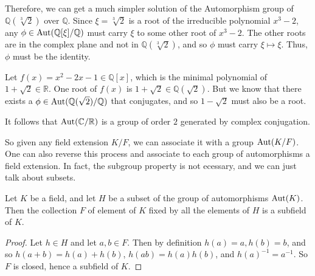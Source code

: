  \begin{example}
    Therefore, we can get a much simpler solution of the Automorphism group of $\mathbb{Q}(\sqrt[3]{2})$ over $\mathbb{Q}$. Since $\xi = \sqrt[3]{2}$ is a root of the irreducible polynomial $x^3 - 2$, any $\phi \in \Aut(\mathbb{Q}[\xi]/\mathbb{Q})$ must carry $\xi$ to some other root of $x^3 - 2$. The other roots are in the complex plane and not in $\mathbb{Q}(\sqrt[3]{2})$, and so $\phi$ must carry $\xi \mapsto \xi$. Thus, $\phi$ must be the identity. 
  \end{example}

  \begin{example}
    Let $f(x) = x^2 - 2x - 1 \in \mathbb{Q}[x]$, which is the minimal polynomial of $1 + \sqrt{2} \in \mathbb{R}$. One root of $f(x)$ is $1 + \sqrt{2} \in \mathbb{Q}(\sqrt{2})$. But we know that there exists a $\phi \in \Aut(\mathbb{Q}(\sqrt{2})/\mathbb{Q})$ that conjugates, and so $1 - \sqrt{2}$ must also be a root. 
  \end{example} 

  \begin{example}
    It follows that $\Aut(\mathbb{C}/\mathbb{R})$ is a group of order $2$ generated by complex conjugation. 
  \end{example} 

  So given any field extension $K/F$, we can associate it with a group $\Aut(K/F)$. One can also reverse this process and associate to each group of automorphisms a field extension. In fact, the subgroup property is not ecessary, and we can just talk about subsets. 

  \begin{theorem}[]
    Let $K$ be a field, and let $H$ be a subset of the group of automorphisms $\Aut(K)$. Then the collection $F$ of element of $K$ fixed by all the elements of $H$ is a subfield of $K$. 
  \end{theorem}
  \begin{proof}
    Let $h \in H$ and let $a, b \in F$. Then by definition $h(a) = a, h(b) = b$, and so $h(a + b) = h(a) + h(b)$, $h(ab) = h(a) h(b)$, and $h(a)^{-1} = a^{-1}$. So $F$ is closed, hence a subfield of $K$. 
  \end{proof}

